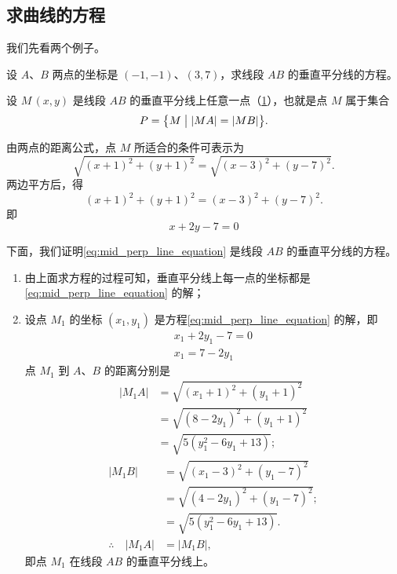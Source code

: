 \subsection{求曲线的方程}
我们先看两个例子。
\begin{example}
  设 $A$、$B$ 两点的坐标是 $(-1,-1)$、$(3,7)$，求线段 $AB$ 的垂直平分线的方程。
\end{example}
\begin{solution}
  设 $M\,(x,y)$ 是线段 $AB$ 的垂直平分线上任意一点（\cref{fig:2-2}），也就是点 $M$ 属于集合
  \[ P = \bigl\{ M \bigm\vert |MA|= |MB| \bigr\}. \]

  由两点的距离公式，点 $M$ 所适合的条件可表示为
  \[ \sqrt{(x+1)^2+(y+1)^2}=\sqrt{(x-3)^2+(y-7)^2}.\]
  两边平方后，得
  \[(x+1)^2+(y+1)^2=(x-3)^2+(y-7)^2.\]
  即
  \begin{equation}
    \label{eq:mid_perp_line_equation}
    x+2y-7=0
  \end{equation}
\end{solution}
\begin{figure}
  \caption{}\label{fig:2-2}
\end{figure}

下面，我们证明\cref{eq:mid_perp_line_equation} 是线段 $AB$ 的垂直平分线的方程。
\begin{enumerate}[1 ]
  \item 由上面求方程的过程可知，垂直平分线上每一点的坐标都是\cref{eq:mid_perp_line_equation} 的解；
  \item 设点 $M_1$ 的坐标 $(x_1,y_1)$ 是方程\cref{eq:mid_perp_line_equation} 的解，即
  \begin{gather*}
    x_1+2y_1-7=0\\
    x_1=7-2y_1
  \end{gather*}
  点 $M_1$ 到 $A$、$B$ 的距离分别是
  \begin{align*}
    |M_1A| & = \sqrt{(x_1+1)^2+(y_1+1)^2}\\
           & = \sqrt{(8-2y_1)^2+(y_1+1)^2}\\
           & = \sqrt{5(y_1^2-6y_1+13)};
  \end{align*}
  \begin{align*}
    |M_1B| & = \sqrt{(x_1-3)^2+(y_1-7)^2}\\
           & = \sqrt{(4-2y_1)^2+(y_1-7)^2};\\
           & = \sqrt{5(y_1^2-6y_1+13)}.\\
    \therefore \quad |M_1A| & = |M_1B|,
  \end{align*}
  即点 $M_1$ 在线段 $AB$ 的垂直平分线上。
\end{enumerate}

